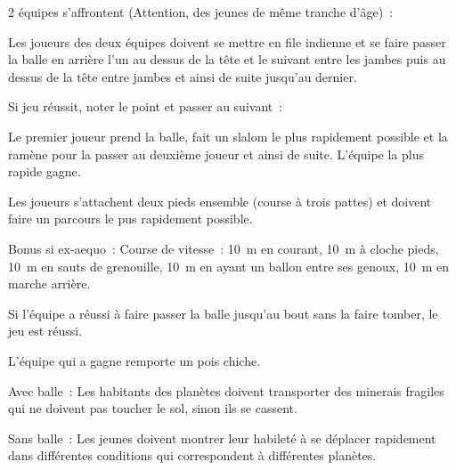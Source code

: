 \documentclass{grand-jeu}
\begin{document}
\begin{regles}
2 équipes s’affrontent (Attention, des jeunes de même tranche d'âge) :

Les joueurs des deux équipes doivent se mettre en file indienne et se faire passer la balle en arrière l’un au dessus de la tête et le suivant entre les jambes puis au dessus de la tête entre jambes et ainsi de suite jusqu’au dernier.

\vspace{0.2cm}

Si jeu réussit, noter le point et passer au suivant :

Le premier joueur prend la balle, fait un slalom le plus rapidement possible et la ramène pour la passer au deuxième joueur et ainsi de suite. L’équipe la plus rapide gagne.

Les joueurs s’attachent deux pieds ensemble (course à trois pattes) et doivent faire un parcours le pus rapidement possible.

\vspace{0.2cm}

Bonus si ex-aequo : Course de vitesse : 10 m en courant, 10 m à cloche pieds, 10 m en sauts de grenouille, 10 m en ayant un ballon entre ses genoux, 10 m en marche arrière.

Si l’équipe a réussi à faire passer la balle jusqu’au bout sans la faire tomber, le jeu est réussi.

L’équipe qui a gagne remporte un pois chiche.
\end{regles}

\begin{imaginaire}
Avec balle : Les habitants des planètes doivent transporter des minerais fragiles qui ne doivent pas toucher le sol, sinon ils se cassent.

Sans balle : Les jeunes doivent montrer leur habileté à se déplacer rapidement dans différentes conditions qui correspondent à différentes planètes.
\end{imaginaire}

\begin{moments-stop}
\end{moments-stop}
\end{document}
